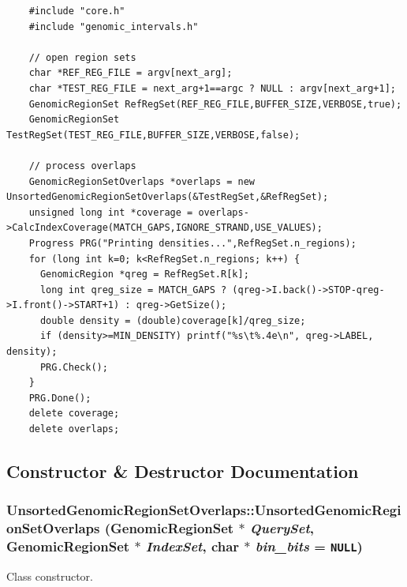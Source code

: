 \begin{Code}\begin{verbatim}    #include "core.h"
    #include "genomic_intervals.h"
    
    // open region sets
    char *REF_REG_FILE = argv[next_arg];
    char *TEST_REG_FILE = next_arg+1==argc ? NULL : argv[next_arg+1];
    GenomicRegionSet RefRegSet(REF_REG_FILE,BUFFER_SIZE,VERBOSE,true);
    GenomicRegionSet TestRegSet(TEST_REG_FILE,BUFFER_SIZE,VERBOSE,false);

    // process overlaps
    GenomicRegionSetOverlaps *overlaps = new UnsortedGenomicRegionSetOverlaps(&TestRegSet,&RefRegSet);
    unsigned long int *coverage = overlaps->CalcIndexCoverage(MATCH_GAPS,IGNORE_STRAND,USE_VALUES); 
    Progress PRG("Printing densities...",RefRegSet.n_regions);
    for (long int k=0; k<RefRegSet.n_regions; k++) {
      GenomicRegion *qreg = RefRegSet.R[k];
      long int qreg_size = MATCH_GAPS ? (qreg->I.back()->STOP-qreg->I.front()->START+1) : qreg->GetSize();
      double density = (double)coverage[k]/qreg_size;
      if (density>=MIN_DENSITY) printf("%s\t%.4e\n", qreg->LABEL, density);
      PRG.Check();
    }
    PRG.Done();
    delete coverage;
    delete overlaps;
\end{verbatim}
\end{Code}

 

\subsection{Constructor \& Destructor Documentation}
\hypertarget{classUnsortedGenomicRegionSetOverlaps_aa858364bf0a3d7986c9d0838a73ccab}{
\subsubsection[UnsortedGenomicRegionSetOverlaps]{\setlength{\rightskip}{0pt plus 5cm}UnsortedGenomicRegionSetOverlaps::UnsortedGenomicRegionSetOverlaps ({\bf GenomicRegionSet} $\ast$ {\em QuerySet}, \/  {\bf GenomicRegionSet} $\ast$ {\em IndexSet}, \/  char $\ast$ {\em bin\_\-bits} = {\tt NULL})}}
\label{classUnsortedGenomicRegionSetOverlaps_aa858364bf0a3d7986c9d0838a73ccab}


Class constructor. 


